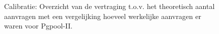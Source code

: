 \begin{figure}[htb!] 
	\centering
	\caption{Calibratie: Overzicht van de vertraging t.o.v. het theoretisch aantal aanvragen met een vergelijking hoeveel werkelijke aanvragen er waren voor Pgpool-II. }
	\label{fig:calibratie-queriesperseconde-pgpool-ii}
\end{figure}


